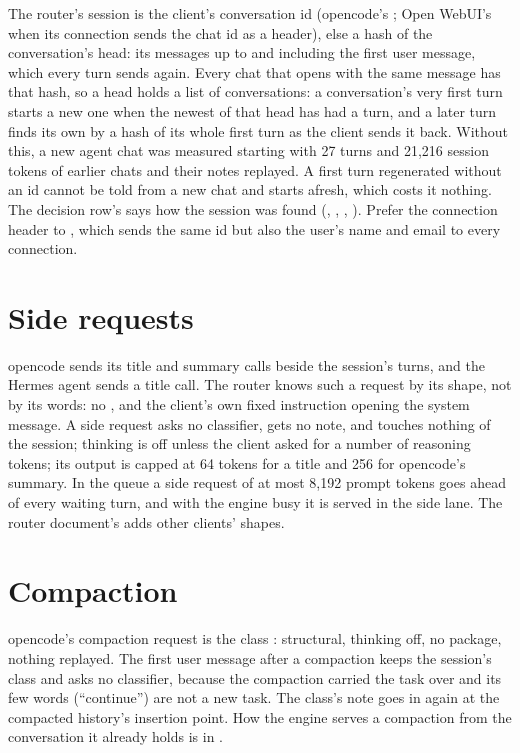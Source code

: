 \label{sec:router-session}The router's session is the client's conversation id (opencode's ; Open WebUI's  when its connection sends the chat id as a header), else a hash of the conversation's head: its messages up to and including the first user message, which every turn sends again. Every chat that opens with the same message has that hash, so a head holds a list of conversations: a conversation's very first turn starts a new one when the newest of that head has had a turn, and a later turn finds its own by a hash of its whole first turn as the client sends it back. Without this, a new agent chat was measured starting with 27 turns and 21,216 session tokens of earlier chats and their notes replayed. A first turn regenerated without an id cannot be told from a new chat and starts afresh, which costs it nothing. The decision row's  says how the session was found (, , , ). Prefer the connection header to , which sends the same id but also the user's name and email to every connection.

\section{Side requests}\label{sec:side-requests}

opencode sends its title and summary calls beside the session's turns, and the Hermes agent sends a title call. The router knows such a request by its shape, not by its words: no , and the client's own fixed instruction opening the system message. A side request asks no classifier, gets no note, and touches nothing of the session; thinking is off unless the client asked for a number of reasoning tokens; its output is capped at 64 tokens for a title and 256 for opencode's summary. In the queue a side request of at most 8,192 prompt tokens goes ahead of every waiting turn, and with the engine busy it is served in the side lane. The router document's  adds other clients' shapes.

\section{Compaction}

opencode's compaction request is the class : structural, thinking off, no package, nothing replayed. The first user message after a compaction keeps the session's class and asks no classifier, because the compaction carried the task over and its few words (\enquote{continue}) are not a new task. The class's note goes in again at the compacted history's insertion point. How the engine serves a compaction from the conversation it already holds is in .

